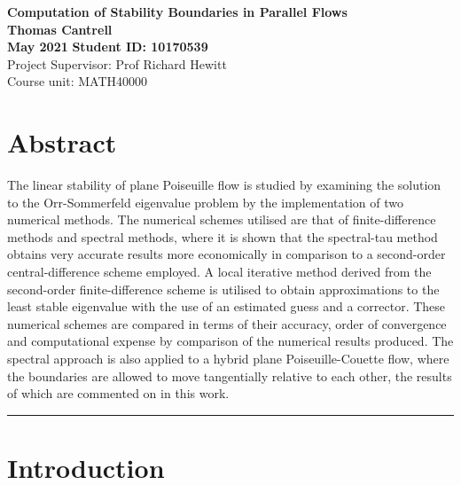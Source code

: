\documentclass[a4paper, 12pt, twoside, openright]{article}
\numberwithin{equation}{section}
\begin{document}



\begin{titlepage}
\begin{center}
\vspace*{1cm}
\LARGE\textbf{Computation of Stability Boundaries in Parallel Flows}\\%
\vspace{1.5cm}
\Large\textbf{Thomas Cantrell}\\%
\textbf{May 2021}
\vfill
\large\textbf{Student ID: 10170539}\\%
Project Supervisor: Prof Richard Hewitt\\
Course unit: MATH40000
\end{center}
\end{titlepage}
\leavevmode\thispagestyle{empty}\newpage


\newpage
\tableofcontents

\newpage
\section{Abstract}
The linear stability of plane Poiseuille flow is studied by examining the solution to the Orr-Sommerfeld eigenvalue problem by the implementation of two numerical methods. The numerical schemes utilised are that of finite-difference methods and spectral methods, where it is shown that the spectral-tau method obtains very accurate results more economically in comparison to a second-order central-difference scheme employed. A local iterative method derived from the second-order finite-difference scheme is utilised to obtain approximations to the least stable eigenvalue with the use of an estimated guess and a corrector. These numerical schemes are compared in terms of their accuracy, order of convergence and computational expense by comparison of the numerical results produced. The spectral approach is also applied to a hybrid plane Poiseuille-Couette flow, where the boundaries are allowed to move tangentially relative to each other, the results of which are commented on in this work. %
\begin{center}
\rule{0.9\linewidth}{1.5pt}
\end{center}
\section{Introduction}
\end{document}
